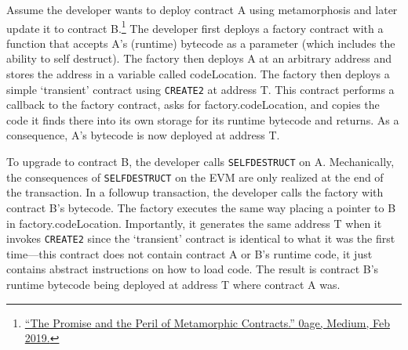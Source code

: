 

Assume the developer wants to deploy contract A using metamorphosis and later update it to contract B.\footnote{\href{https://medium.com/@0age/the-promise-and-the-peril-of-metamorphic-contracts-9eb8b8413c5e}{``The Promise and the Peril of Metamorphic Contracts.'' 0age, Medium, Feb 2019.}} The developer first deploys a factory contract with a function that accepts A's (runtime) bytecode as a parameter (which includes the ability to self destruct). The factory then deploys A at an arbitrary address and stores the address in a variable called codeLocation. The factory then deploys a simple `transient' contract using \texttt{CREATE2} at address T. This contract performs a callback to the factory contract, asks for factory.codeLocation, and copies the code it finds there into its own storage for its runtime bytecode and returns. As a consequence, A's bytecode is now deployed at address T. 

To upgrade to contract B, the developer calls \texttt{SELFDESTRUCT} on A. Mechanically, the consequences of \texttt{SELFDESTRUCT} on the EVM are only realized at the end of the transaction. In a followup transaction, the developer calls the factory with contract B's bytecode. The factory executes the same way placing a pointer to B in factory.codeLocation. Importantly, it generates the same address T when it invokes \texttt{CREATE2} since the `transient' contract is identical to what it was the first time---this contract does not contain contract A or B's runtime code, it just contains abstract instructions on how to load code. The result is contract B's runtime bytecode being deployed at address T where contract A was. 
 

